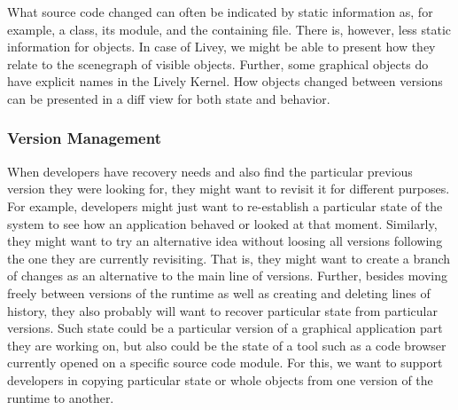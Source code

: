 What source code changed can often be indicated by static information as, for example, a class, its module, and the containing file.
There is, however, less static information for objects.
In case of Livey, we might be able to present how they relate to the scenegraph of visible objects.
Further, some graphical objects do have explicit names in the Lively Kernel.
How objects changed between versions can be presented in a diff view for both state and behavior.

\subsubsection{Version Management}

When developers have recovery needs and also find the particular previous version they were looking for, they might want to revisit it for different purposes.
For example, developers might just want to re-establish a particular state of the system to see how an application behaved or looked at that moment.
Similarly, they might want to try an alternative idea without loosing all versions following the one they are currently revisiting.
That is, they might want to create a branch of changes as an alternative to the main line of versions.
Further, besides moving freely between versions of the runtime as well as creating and deleting lines of history, they also probably will want to recover particular state from particular versions.
Such state could be a particular version of a graphical application part they are working on, but also could be the state of a tool such as a code browser currently opened on a specific source code module.
For this, we want to support developers in copying particular state or whole objects from one version of the runtime to another.

